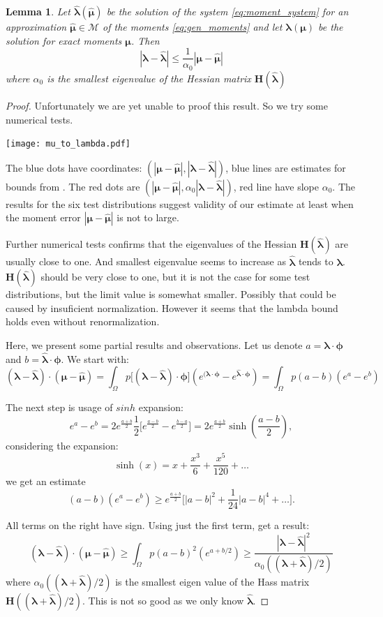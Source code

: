 \documentclass{article}
\newtheorem{lemma}[theorem]{Lemma}
\def\vc#1{\mathbf{\boldsymbol{#1}}}     %
\def\tn#1{\boldsymbol{#1}}
\def\abs#1{|#1|}
\def\vl{{\vc\lambda}}
\def\estvl{{\vc{\hat\lambda}}}
\def\vmu{\vc\mu}
\def\estvmu{{\vc{\hat\mu}}}
\def\vphi{\vc\phi}
\begin{document}
\begin{lemma}
\label{thm:lambda_est}
Let $\estvl(\estvmu)$ be the solution of the system \eqref{eq:moment_system} for an approximation 
$\estvmu \in \mathcal M$ of the moments \eqref{eq:gen_moments} and let $\vl(\vmu)$ be the solution 
for exact moments $\vmu$. Then
\[
   \abs{\vl - \estvl} \le \frac{1}{\alpha_0} \abs{\vmu - \estvmu} 
\]
where $\alpha_0$ is the smallest eigenvalue of the Hessian matrix $\tn H(\estvl)$
\end{lemma}
\begin{proof}
Unfortunately we are yet unable to proof this result. So we try some numerical tests.

\texttt{[image: mu\_to\_lambda.pdf]}

The blue dots have coordinates: $(|\vmu - \estvmu|, |\vl - \estvl|)$, blue lines are estimates for bounds from \cite{Barron1991}. The red dots are $(|\vmu - \estvmu|, \alpha_0|\vl - \estvl|)$,
red line have slope $\alpha_0$. The results for the six test distributions suggest validity of our estimate at least when the moment error $|\vmu - \estvmu|$ is not to large.

Further numerical tests confirms that the eigenvalues of the Hessian $\tn H(\estvl)$ are usually close to one. And smallest eigenvalue seems to increase as $\estvl$ tends to $\vl$. 
$\tn H(\estvl)$ should be very close to one, but it is not the case for some test distributions, but the limit value is somewhat smaller. Possibly that could be caused by insuficient normalization. 
However it seems that the lambda bound holds even without renormalization.

Here, we present some partial results and observations.
Let us denote $a=\vl\cdot\vphi$ and $b = \estvl\cdot\vphi$. We start with:
\[
  (\vl - \estvl)\cdot(\vmu - \estvmu)
      = \int_{\Omega} p \big[(\vl - \estvl)\cdot\vphi\big] (e^{(\vl\cdot\vphi} - e^{\estvl\cdot\vphi})
      =\int_{\Omega} p (a - b)(e^a - e^b)
\]

The next step is usage of $sinh$ expansion:
\[
 e^a - e^b = 2 e^{\frac{a+b}{2}}\frac{1}{2}\Big[e^{\frac{a-b}{2}} - e^{\frac{b-a}{2}}\Big] = 
 2 e^{\frac{a+b}{2}}\sinh(\frac{a-b}{2}),
\]
considering the expansion:
\[
    \sinh(x) = x + \frac{x^3}{6} + \frac{x^5}{120} + \dots
\]
we get an estimate
 \[
  (a-b)(e^a - e^b) \ge e^{\frac{a+b}{2}}\Big[|a-b|^2 + \frac{1}{24}|a-b|^4 + \dots\Big].
 \]

 All terms on the right have sign. Using just the first term, get a result:
\[
  (\vl - \estvl)\cdot(\vmu - \estvmu) \ge \int_{\Omega} p (a - b)^2(e^{a+b/2})
   \ge \frac{|\vl - \estvl|^2}{\alpha_0((\vl + \estvl)/2)}
\]
where $\alpha_0((\vl + \estvl)/2)$ is the smallest eigen value of the Hass matrix
$\tn H((\vl + \estvl)/2)$. This is not so good as we only know $\estvl$. 


\end{proof}
\end{document}
